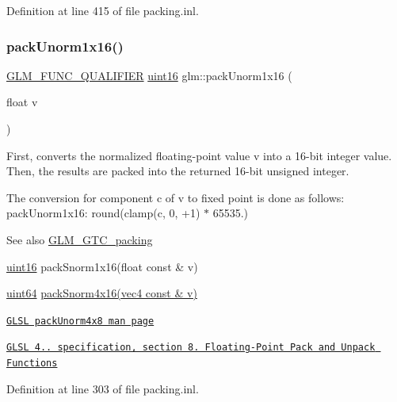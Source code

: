 Definition at line 415 of file packing.\+inl.

\mbox{\label{group__gtc__packing_ga60c7d915f5653559ae02c2f79a8c5c1d}} 
\subsubsection{\texorpdfstring{pack\+Unorm1x16()}{packUnorm1x16()}}
{\footnotesize\ttfamily \hyperlink{setup_8hpp_a33fdea6f91c5f834105f7415e2a64407}{G\+L\+M\+\_\+\+F\+U\+N\+C\+\_\+\+Q\+U\+A\+L\+I\+F\+I\+ER} \hyperlink{group__gtc__type__precision_gad8c2939e1fdd8e5828b31d95c52255d5}{uint16} glm\+::pack\+Unorm1x16 (\begin{DoxyParamCaption}\item[{float}]{v }\end{DoxyParamCaption})}

First, converts the normalized floating-\/point value v into a 16-\/bit integer value. Then, the results are packed into the returned 16-\/bit unsigned integer.

The conversion for component c of v to fixed point is done as follows\+: pack\+Unorm1x16\+: round(clamp(c, 0, +1) $\ast$ 65535.)

\begin{DoxySeeAlso}{See also}
\hyperlink{group__gtc__packing}{G\+L\+M\+\_\+\+G\+T\+C\+\_\+packing} 

\hyperlink{group__gtc__type__precision_gad8c2939e1fdd8e5828b31d95c52255d5}{uint16} pack\+Snorm1x16(float const \& v) 

\hyperlink{group__gtc__type__precision_gae3632bf9b37da66233d78930dd06378a}{uint64} \hyperlink{group__gtc__packing_ga9b237d7c66b7a71964e6d1f4dc06539f}{pack\+Snorm4x16(vec4 const \& v)} 

\href{http://www.opengl.org/sdk/docs/manglsl/xhtml/packUnorm4x8.xml}{\tt G\+L\+SL pack\+Unorm4x8 man page} 

\href{http://www.opengl.org/registry/doc/GLSLangSpec.4.20.8.pdf}{\tt G\+L\+SL 4.. specification, section 8. Floating-\/\+Point Pack and Unpack Functions} 
\end{DoxySeeAlso}


Definition at line 303 of file packing.\+inl.

